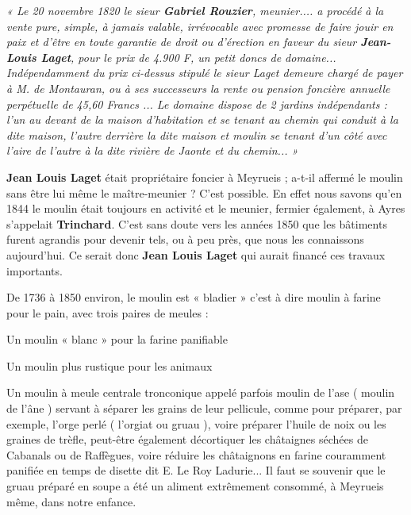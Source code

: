 \begin{flushleft}
\hspace{1cm}
\parbox{0.82\textwidth}{
\textit{
« Le 20 novembre 1820 le sieur \textbf{Gabriel Rouzier}, meunier.... a procédé à la vente pure,
simple, à jamais valable, irrévocable avec promesse de faire jouir en paix et d’être en toute garantie
de droit ou d’érection en faveur du sieur \textbf{Jean-Louis Laget}, pour le prix de 4.900 F, un
petit doncs de domaine...
Indépendamment du prix ci-dessus stipulé le sieur Laget demeure chargé de payer à M. de
Montauran, ou à ses successeurs la rente ou pension foncière annuelle perpétuelle de 45,60
Francs ...
Le domaine dispose de 2 jardins indépendants : l’un au devant de la maison d’habitation et se
tenant au chemin qui conduit à la dite maison, l’autre derrière la dite maison et moulin se tenant
d’un côté avec l’aire de l’autre à la dite rivière de Jaonte et du chemin... »}
}
\end{flushleft}

\vspace{0.25cm}

\noindent
\textbf{Jean Louis Laget} était propriétaire foncier à Meyrueis ; a-t-il affermé le moulin sans être
lui même le maître-meunier ? C’est possible. En effet nous savons qu’en 1844 le moulin
était toujours en activité et le meunier, fermier également, à Ayres s’appelait \textbf{Trinchard}.
C’est sans doute vers les années 1850 que les bâtiments furent agrandis pour devenir tels,
ou à peu près, que nous les connaissons aujourd’hui. Ce serait donc \textbf{Jean Louis Laget}
qui aurait financé ces travaux importants.

De 1736 à 1850 environ, le moulin est « bladier » c’est à dire moulin à farine pour le pain,
avec trois paires de meules :

Un moulin « blanc » pour la farine panifiable

Un moulin plus rustique pour les animaux

Un moulin à meule centrale tronconique appelé parfois moulin de l’ase ( moulin de l’âne )
servant à séparer les grains de leur pellicule, comme pour préparer, par exemple, l’orge perlé
( l’orgiat ou gruau ), voire préparer l’huile de noix ou les graines de trèfle, peut-être
également décortiquer les châtaignes séchées de Cabanals ou de Raffègues, voire réduire les
châtaignons en farine couramment panifiée en temps de disette dit E. Le Roy Ladurie... Il
faut se souvenir que le gruau préparé en soupe a été un aliment extrêmement consommé, à
Meyrueis même, dans notre enfance.


